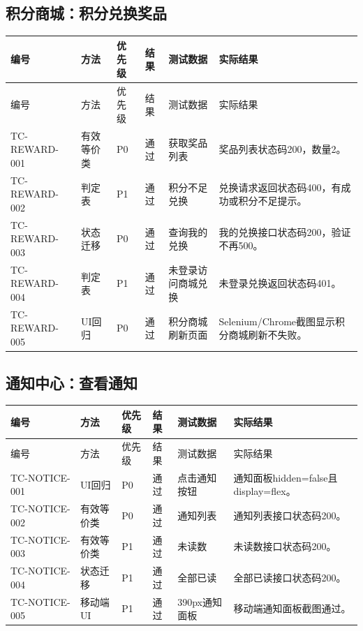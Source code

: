 \documentclass[bwprint]{report}
\begin{document}
\subsection{积分商城：积分兑换奖品}
{\footnotesize
\setlength{\tabcolsep}{3pt}
\begin{longtable}{P{2.0cm}P{2.0cm}P{0.9cm}P{0.9cm}P{3.4cm}P{5.4cm}}
\toprule
编号 & 方法 & 优先级 & 结果 & 测试数据 & 实际结果\\
\midrule
\endfirsthead
\toprule
编号 & 方法 & 优先级 & 结果 & 测试数据 & 实际结果\\
\midrule
\endhead
TC-REWARD-001 & 有效等价类 & P0 & 通过 & 获取奖品列表 & 奖品列表状态码200，数量2。 \\
TC-REWARD-002 & 判定表 & P1 & 通过 & 积分不足兑换 & 兑换请求返回状态码400，有成功或积分不足提示。 \\
TC-REWARD-003 & 状态迁移 & P0 & 通过 & 查询我的兑换 & 我的兑换接口状态码200，验证不再500。 \\
TC-REWARD-004 & 判定表 & P1 & 通过 & 未登录访问商城兑换 & 未登录兑换返回状态码401。 \\
TC-REWARD-005 & UI回归 & P0 & 通过 & 积分商城刷新页面 & Selenium/Chrome截图显示积分商城刷新不失败。 \\
\bottomrule
\end{longtable}
}
\subsection{通知中心：查看通知}
{\footnotesize
\setlength{\tabcolsep}{3pt}
\begin{longtable}{P{2.0cm}P{2.0cm}P{0.9cm}P{0.9cm}P{3.4cm}P{5.4cm}}
\toprule
编号 & 方法 & 优先级 & 结果 & 测试数据 & 实际结果\\
\midrule
\endfirsthead
\toprule
编号 & 方法 & 优先级 & 结果 & 测试数据 & 实际结果\\
\midrule
\endhead
TC-NOTICE-001 & UI回归 & P0 & 通过 & 点击通知按钮 & 通知面板hidden=false且display=flex。 \\
TC-NOTICE-002 & 有效等价类 & P0 & 通过 & 通知列表 & 通知列表接口状态码200。 \\
TC-NOTICE-003 & 有效等价类 & P1 & 通过 & 未读数 & 未读数接口状态码200。 \\
TC-NOTICE-004 & 状态迁移 & P1 & 通过 & 全部已读 & 全部已读接口状态码200。 \\
TC-NOTICE-005 & 移动端UI & P1 & 通过 & 390px通知面板 & 移动端通知面板截图通过。 \\
\bottomrule
\end{longtable}
}
\end{document}
